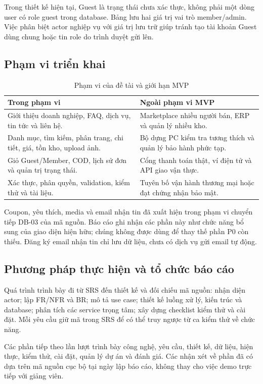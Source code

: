 Trong thiết kế hiện tại, Guest là trạng thái chưa xác thực, không phải một dòng user có role guest trong database. Bảng  lưu hai giá trị vai trò member/admin. Việc phân biệt actor nghiệp vụ với giá trị lưu trữ giúp tránh tạo tài khoản Guest dùng chung hoặc tin role do trình duyệt gửi lên.

\subsection{Phạm vi triển khai}
\begin{table}[H]\centering
\caption{Phạm vi của đề tài và giới hạn MVP}\label{tab:scope}
\begin{tabularx}{\linewidth}{@{}YY@{}}\toprule
Trong phạm vi & Ngoài phạm vi MVP \\ \midrule
Giới thiệu doanh nghiệp, FAQ, dịch vụ, tin tức và liên hệ. & Marketplace nhiều người bán, ERP và quản lý nhiều kho.\\
Danh mục, tìm kiếm, phân trang, chi tiết, giá, tồn kho, upload ảnh. & Bộ dựng PC kiểm tra tương thích và quản lý bảo hành phức tạp.\\
Giỏ Guest/Member, COD, lịch sử đơn và quản trị trạng thái. & Cổng thanh toán thật, ví điện tử và API giao vận thực.\\
Xác thực, phân quyền, validation, kiểm thử và tài liệu. & Tuyên bố vận hành thương mại hoặc đạt chứng nhận bảo mật.\\
\bottomrule\end{tabularx}
\end{table}

Coupon, yêu thích, media và email nhận tin đã xuất hiện trong phạm vi chuyển tiếp DB-03 của mã nguồn. Báo cáo ghi nhận các phần này như chức năng bổ sung của giao diện hiện hữu; chúng không được dùng để thay thế phần P0 còn thiếu. Đăng ký email nhận tin chỉ lưu dữ liệu, chưa có dịch vụ gửi email tự động.

\subsection{Phương pháp thực hiện và tổ chức báo cáo}
Quá trình trình bày đi từ SRS đến thiết kế và đối chiếu mã nguồn: nhận diện actor; lập FR/NFR và BR; mô tả use case; thiết kế luồng xử lý, kiến trúc và database; phân tích các service trọng tâm; xây dựng checklist kiểm thử và cài đặt. Mỗi yêu cầu giữ mã trong SRS để có thể truy ngược từ ca kiểm thử về chức năng.

Các phần tiếp theo lần lượt trình bày công nghệ, yêu cầu, thiết kế, dữ liệu, hiện thực, kiểm thử, cài đặt, quản lý dự án và đánh giá. Các nhận xét về phần đã có dựa trên mã nguồn cục bộ tại ngày lập báo cáo, không thay cho việc demo trực tiếp với giảng viên.
\clearpage
